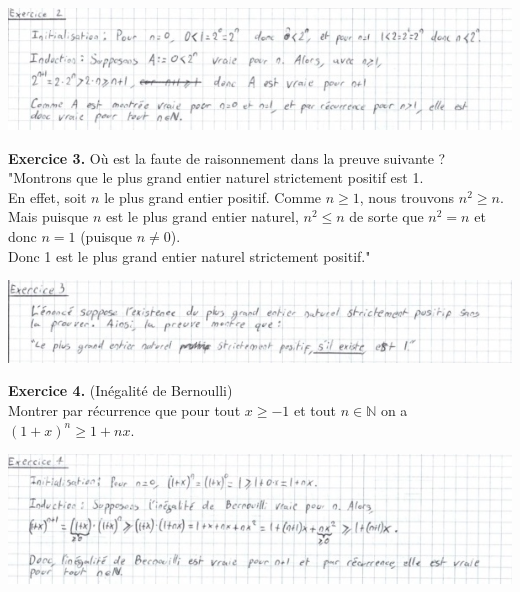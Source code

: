 \documentclass[a4paper, 10pt]{report}
\begin{document}
	\includegraphics{ex02.jpg}	
	
	\newpage
	
	\fancyhf{}
	\renewcommand{\headrule}
	{\rule{\textwidth}{0pt}}
	
	\noindent
	\textbf{Exercice 3.} Où est la faute de raisonnement dans la preuve
	suivante ? \\
	"Montrons que le plus grand entier naturel strictement positif est 1.\\
	En effet, soit $n$ le plus grand entier positif. Comme $n \geq 1$, nous
	trouvons $n^2 \geq n$. Mais puisque $n$ est le plus grand entier
	naturel, $n^2 \leq n$ de sorte que $n^2 = n$ et donc $n = 1$
	(puisque $n \neq 0$).\\
	Donc 1 est le plus grand entier naturel strictement positif."
	
	\includegraphics{ex03.jpg}
	
	\vspace{5mm}
	\noindent
	\textbf{Exercice 4.} (Inégalité de Bernoulli)\\
	Montrer par récurrence que pour tout $x \geq -1$ et tout
	$n \in \mathbb{N}$ on a $(1 + x)^n \geq 1 + nx$.
	
	\includegraphics{ex04.jpg}
	
	\newpage
	
\end{document}
